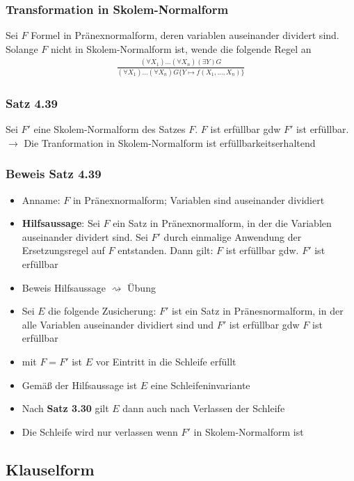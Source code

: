 \subsubsection{Transformation in Skolem-Normalform}
Sei \(F\) Formel in Pränexnormalform, deren variablen auseinander dividert sind. Solange \(F\) nicht in Skolem-Normalform ist, wende die folgende Regel an
\begin{align*}
\frac{(\forall X_1) \ldots (\forall X_n)(\exists Y)G}{(\forall X_1)\ldots (\forall X_n)G \{Y\mapsto f(X_1 ,\ldots , X_n)\} }
\end{align*}
\subsubsection{Satz 4.39}
Sei \(F'\) eine Skolem-Normalform des Satzes \(F\). \(F\) ist erfüllbar gdw  \(F'\) ist erfüllbar.\\ \(\to\) Die Tranformation in Skolem-Normalform ist erfüllbarkeitserhaltend
\subsubsection{Beweis Satz 4.39}
\begin{itemize}
	\item Anname: \(F\) in Pränexnormalform; Variablen sind auseinander dividiert
	\item \textbf{Hilfsaussage}: Sei \(F\) ein Satz in Pränexnormalform, in der die Variablen auseinander dividert sind. Sei \(F'\) durch einmalige Anwendung der Ersetzungsregel auf \(F\) entstanden. Dann gilt: \(F\) ist erfüllbar gdw. \(F'\) ist erfüllbar
	\item Beweis Hilfsaussage \(\rightsquigarrow\) Übung
	\item Sei \(E\) die folgende Zusicherung: \(F'\) ist ein Satz in Pränesnormalform, in der alle Variablen auseinander dividiert sind und \(F'\) ist erfüllbar gdw \(F\) ist erfüllbar
	\item mit \(F = F'\) ist \(E\) vor Eintritt in die Schleife erfüllt
	\item Gemäß der Hilfsaussage ist \(E\) eine Schleifeninvariante
	\item Nach \textbf{Satz 3.30} gilt \(E\) dann auch nach Verlassen der Schleife
	\item Die Schleife wird nur verlassen wenn \(F'\) in Skolem-Normalform ist
\end{itemize}
\subsection{Klauselform}
